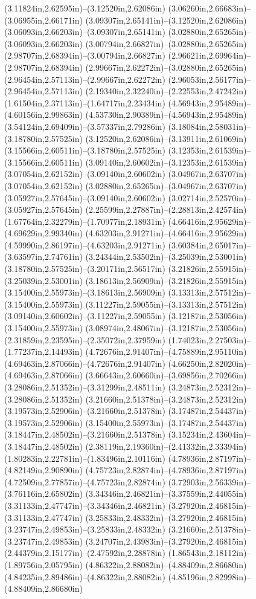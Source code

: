 (3.11824in,2.62595in)--(3.12520in,2.62086in) (3.06260in,2.66683in)--(3.06955in,2.66171in) (3.09307in,2.65141in)--(3.12520in,2.62086in) (3.06093in,2.66203in)--(3.09307in,2.65141in) (3.02880in,2.65265in)--(3.06093in,2.66203in) (3.00794in,2.66827in)--(3.02880in,2.65265in) (2.98707in,2.68394in)--(3.00794in,2.66827in) (2.96621in,2.69964in)--(2.98707in,2.68394in) (2.99667in,2.62272in)--(3.02880in,2.65265in) (2.96454in,2.57113in)--(2.99667in,2.62272in) (2.96053in,2.56177in)--(2.96454in,2.57113in) (2.19340in,2.32240in)--(2.22553in,2.47242in) (1.61504in,2.37113in)--(1.64717in,2.23434in) (4.56943in,2.95489in)--(4.60156in,2.99863in) (4.53730in,2.90389in)--(4.56943in,2.95489in) (3.54124in,2.69409in)--(3.57337in,2.79286in) (3.18084in,2.58031in)--(3.18780in,2.57525in) (3.12520in,2.62086in)--(3.13911in,2.61069in) (3.15566in,2.60511in)--(3.18780in,2.57525in) (3.12353in,2.61539in)--(3.15566in,2.60511in) (3.09140in,2.60602in)--(3.12353in,2.61539in) (3.07054in,2.62152in)--(3.09140in,2.60602in) (3.04967in,2.63707in)--(3.07054in,2.62152in) (3.02880in,2.65265in)--(3.04967in,2.63707in) (3.05927in,2.57645in)--(3.09140in,2.60602in) (3.02714in,2.52570in)--(3.05927in,2.57645in) (2.25599in,2.27887in)--(2.28813in,2.42574in) (1.67764in,2.32279in)--(1.70977in,2.18931in) (4.66416in,2.95629in)--(4.69629in,2.99340in) (4.63203in,2.91271in)--(4.66416in,2.95629in) (4.59990in,2.86197in)--(4.63203in,2.91271in) (3.60384in,2.65017in)--(3.63597in,2.74761in) (3.24344in,2.53502in)--(3.25039in,2.53001in) (3.18780in,2.57525in)--(3.20171in,2.56517in) (3.21826in,2.55915in)--(3.25039in,2.53001in) (3.18613in,2.56909in)--(3.21826in,2.55915in) (3.15400in,2.55973in)--(3.18613in,2.56909in) (3.13313in,2.57512in)--(3.15400in,2.55973in) (3.11227in,2.59055in)--(3.13313in,2.57512in) (3.09140in,2.60602in)--(3.11227in,2.59055in) (3.12187in,2.53056in)--(3.15400in,2.55973in) (3.08974in,2.48067in)--(3.12187in,2.53056in) (2.31859in,2.23595in)--(2.35072in,2.37959in) (1.74023in,2.27503in)--(1.77237in,2.14493in) (4.72676in,2.91407in)--(4.75889in,2.95110in) (4.69463in,2.87066in)--(4.72676in,2.91407in) (4.66250in,2.82020in)--(4.69463in,2.87066in) (3.66643in,2.60660in)--(3.69856in,2.70266in) (3.28086in,2.51352in)--(3.31299in,2.48511in) (3.24873in,2.52312in)--(3.28086in,2.51352in) (3.21660in,2.51378in)--(3.24873in,2.52312in) (3.19573in,2.52906in)--(3.21660in,2.51378in) (3.17487in,2.54437in)--(3.19573in,2.52906in) (3.15400in,2.55973in)--(3.17487in,2.54437in) (3.18447in,2.48502in)--(3.21660in,2.51378in) (3.15234in,2.43604in)--(3.18447in,2.48502in) (2.38119in,2.19360in)--(2.41332in,2.33394in) (1.80283in,2.22781in)--(1.83496in,2.10116in) (4.78936in,2.87197in)--(4.82149in,2.90890in) (4.75723in,2.82874in)--(4.78936in,2.87197in) (4.72509in,2.77857in)--(4.75723in,2.82874in) (3.72903in,2.56339in)--(3.76116in,2.65802in) (3.34346in,2.46821in)--(3.37559in,2.44055in) (3.31133in,2.47747in)--(3.34346in,2.46821in) (3.27920in,2.46815in)--(3.31133in,2.47747in) (3.25833in,2.48332in)--(3.27920in,2.46815in) (3.23747in,2.49853in)--(3.25833in,2.48332in) (3.21660in,2.51378in)--(3.23747in,2.49853in) (3.24707in,2.43983in)--(3.27920in,2.46815in) (2.44379in,2.15177in)--(2.47592in,2.28878in) (1.86543in,2.18112in)--(1.89756in,2.05795in) (4.86322in,2.88082in)--(4.88409in,2.86680in) (4.84235in,2.89486in)--(4.86322in,2.88082in) (4.85196in,2.82998in)--(4.88409in,2.86680in) 